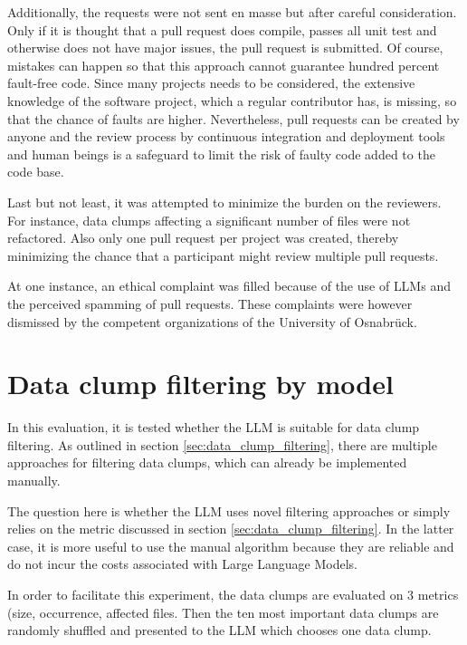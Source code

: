 Additionally, the requests were not sent en masse but after careful consideration. Only if it is thought that a pull request does compile, passes all unit test and otherwise does not have major issues, the pull request is submitted. Of course, mistakes can happen so that this approach cannot guarantee hundred percent fault-free code. Since many projects needs to be considered, the extensive knowledge of the software project, which a regular contributor has, is missing, so that the chance of faults are higher. Nevertheless, pull requests can be created by anyone and the review process by continuous integration and deployment tools and human beings is a safeguard to limit the risk of faulty code added to the code base. 

Last but not least, it was attempted to minimize the burden on the reviewers. For instance, data clumps affecting a significant number of files were not refactored. Also only one pull request per project was created, thereby minimizing the chance that a participant might review multiple pull requests. 

At one instance, an ethical complaint was filled because of the use of \acfp{LLM} and the perceived spamming of pull requests. These complaints were however dismissed by the competent organizations of the University of Osnabrück.  



\section{Data clump filtering by model}

In this evaluation, it is tested whether the  \ac{LLM} is suitable for data clump filtering. As outlined in section \ref{sec:data_clump_filtering}, there are multiple approaches for filtering data clumps, which can already be implemented manually. 

The question here is whether the \ac{LLM} uses novel filtering approaches or simply relies on the metric discussed in section \ref{sec:data_clump_filtering}. In the latter case, it is more useful to use the manual algorithm because they are reliable and do not incur the costs associated with Large Language Models. 

In order to facilitate this experiment, the data clumps are evaluated on 3 metrics (size, occurrence, affected files. Then the ten most important data clumps are randomly shuffled and presented to the \ac{LLM} which chooses one data clump. 


